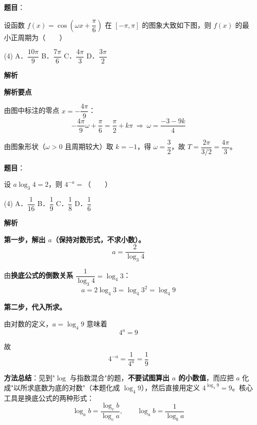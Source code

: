 \begin{answer}

\textbf{题目}：

设函数 $f(x)=\cos\left(\omega x+\dfrac\pi6\right)$ 在 $[-\pi,\pi]$ 的图象大致如下图，则 $f(x)$ 的最小正周期为\mbox{（　　）}
\nopagebreak[4]
\begin{center}\end{center}
\nopagebreak[4]
\begin{gkopts}(4)
\task A．$\dfrac{10\pi}9$
\task B．$\dfrac{7\pi}6$
\task C．$\dfrac{4\pi}3$
\task D．$\dfrac{3\pi}2$
\end{gkopts}

\textbf{解析}

\textbf{解析要点}

由图中标注的零点 $x=-\dfrac{4\pi}9$：
\nopagebreak[4]
\[-\frac{4\pi}9\omega+\frac\pi6=\frac\pi2+k\pi\ \Longrightarrow\ \omega=\frac{-3-9k}4\]

由图象形状（$\omega>0$ 且周期较大）取 $k=-1$，得 $\omega=\dfrac32$，故 $T=\dfrac{2\pi}{3/2}=\dfrac{4\pi}3$。


\par\medskip

\end{answer}
\begin{answer}

\textbf{题目}：

设 $a\log_3 4=2$，则 $4^{-a}=$\mbox{（　　）}

\begin{gkopts}(4)
\task A．$\dfrac1{16}$
\task B．$\dfrac19$
\task C．$\dfrac18$
\task D．$\dfrac16$
\end{gkopts}

\textbf{解析}

\textbf{第一步，解出 $a$（保持对数形式，不求小数）。}
\nopagebreak[4]
\[a=\frac2{\log_3 4}\]

由\textbf{换底公式的倒数关系} $\dfrac1{\log_3 4}=\log_4 3$：
\nopagebreak[4]
\[a=2\log_4 3=\log_4 3^{2}=\log_4 9\]

\textbf{第二步，代入所求。}

由对数的定义，$a=\log_4 9$ 意味着
\nopagebreak[4]
\[4^{a}=9\]

故
\nopagebreak[4]
\[4^{-a}=\frac1{4^{a}}=\frac19\]

\begin{gktip}
\textbf{方法总结}：见到"$\log$ 与指数混合"的题，\textbf{不要试图算出 $a$ 的小数值}，而应把 $a$ 化成"以所求底数为底的对数"（本题化成 $\log_4 9$），然后直接用定义 $4^{\log_4 9}=9$。核心工具是换底公式的两种形式：
\nopagebreak[4]
\[\log_a b=\frac{\log_c b}{\log_c a},\qquad \log_a b=\frac1{\log_b a}\]
\end{gktip}


\par\medskip

\end{answer}
